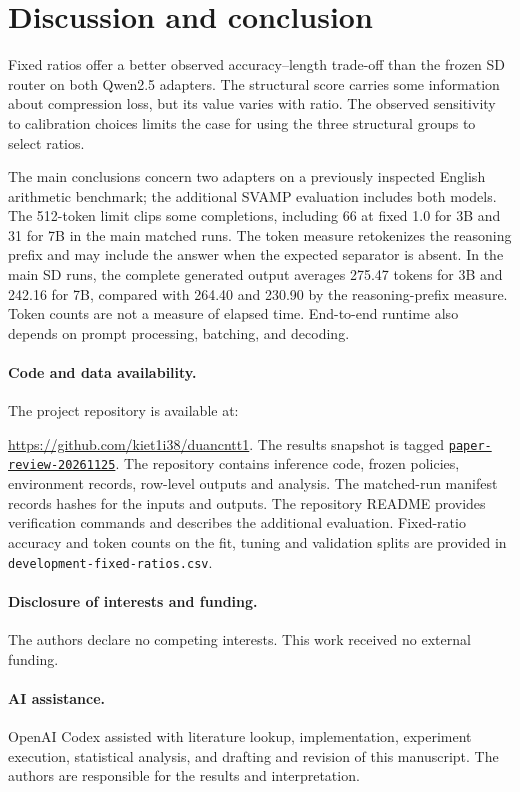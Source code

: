 \documentclass[a4paper,runningheads]{llncs}
\begin{document}
\section{Discussion and conclusion}
Fixed ratios offer a better observed accuracy--length trade-off than the frozen SD router on both Qwen2.5 adapters. The structural score carries some information about compression loss, but its value varies with ratio. The observed sensitivity to calibration choices limits the case for using the three structural groups to select ratios.

The main conclusions concern two adapters on a previously inspected English arithmetic benchmark; the additional SVAMP evaluation includes both models. The 512-token limit clips some completions, including 66 at fixed 1.0 for 3B and 31 for 7B in the main matched runs. The token measure retokenizes the reasoning prefix and may include the answer when the expected separator is absent. In the main SD runs, the complete generated output averages 275.47 tokens for 3B and 242.16 for 7B, compared with 264.40 and 230.90 by the reasoning-prefix measure. Token counts are not a measure of elapsed time. End-to-end runtime also depends on prompt processing, batching, and decoding.

\paragraph{Code and data availability.}
The project repository is available at:
\par\noindent\url{https://github.com/kiet1i38/duancntt1}.
The results snapshot is tagged \href{https://github.com/kiet1i38/duancntt1/tree/paper-review-20261125}{\texttt{paper-review-20261125}}. The repository contains inference code, frozen policies, environment records, row-level outputs and analysis. The matched-run manifest records hashes for the inputs and outputs. The repository README provides verification commands and describes the additional evaluation. Fixed-ratio accuracy and token counts on the fit, tuning and validation splits are provided in \texttt{development-fixed-ratios.csv}.

\paragraph{Disclosure of interests and funding.}
The authors declare no competing interests. This work received no external funding.

\paragraph{AI assistance.}
OpenAI Codex assisted with literature lookup, implementation, experiment execution, statistical analysis, and drafting and revision of this manuscript. The authors are responsible for the results and interpretation.
\end{document}
